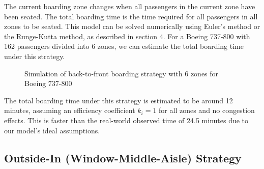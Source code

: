 \documentclass[12pt]{article}
\begin{document}
The current boarding zone changes when all passengers in the current zone have been seated. The total boarding time is the time required for all passengers in all zones to be seated. This model can be solved numerically using Euler's method or the Runge-Kutta method, as described in section 4. For a Boeing 737-800 with 162 passengers divided into 6 zones, we can estimate the total boarding time under this strategy.

\begin{figure}[H]
\centering
{}
\caption{Simulation of back-to-front boarding strategy with 6 zones for Boeing 737-800}
\end{figure}

The total boarding time under this strategy is estimated to be around 12 minutes, assuming an efficiency coefficient $k_i = 1$ for all zones and no congestion effects. This is faster than the real-world observed time of 24.5 minutes due to our model's ideal assumptions.

\subsection{Outside-In (Window-Middle-Aisle) Strategy}
\end{document}
